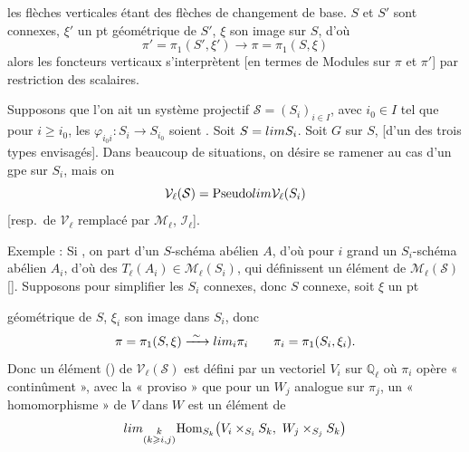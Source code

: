 \documentclass[11pt,a4paper]{article}
\begin{document}
les flèches verticales étant des flèches de changement de base.
 $S$ et $S'$ sont connexes, $\xi'$ un pt géométrique de
$S'$, $\xi$ son image sur $S$, d'où
\[
\pi' = \pi_{1}(S', \xi') \longrightarrow \pi = \pi_{1}(S, \xi)
\]
alors les foncteurs verticaux s'interprètent [en termes de
\struck{\ill{}} Modules sur $\pi$ et $\pi'$] par restriction des scalaires.

Supposons que l'on ait un système projectif $\mathcal{S} =
(S_{i})_{i \in I}$, avec $i_{0} \in I$ tel que pour $i \geqslant i_{0}$,
les $\varphi_{i_{0}i} : S_{i} \to S_{i_{0}}$ soient .
Soit $S = \varprojlim S_{i}$. Soit $G$ sur $S$, [d'un des trois types
envisagés]. Dans beaucoup de situations, on désire se ramener au cas d'un
gpe sur $S_{i}$, mais on  \ill{} \ill{} \ill{}
\[
\mathcal{V}_{\ell}(\mathcal{S}) = \text{Pseudo}\varinjlim \mathcal{V}_{\ell}(S_{i})
\]
[resp.\ de $\mathcal{V}_{\ell}$ remplacé par $\mathcal{M}_{\ell}$,
$\mathcal{I}_{\ell}$].

Exemple : Si , on part d'un \struck{\ill{}}
$S$-schéma abélien $A$, d'où pour $i$ grand un $S_{i}$-schéma abélien
$A_{i}$, d'où des $T_{\ell}(A_{i}) \in \mathcal{M}_{\ell}(S_{i})$, qui
définissent un élément de \struck{\ill{}} $\mathcal{M}_{\ell}(\mathcal{S})$
[\ill{}]. Supposons pour simplifier les $S_{i}$ connexes, donc $S$
connexe, soit $\xi$ un pt

géométrique de $S$, $\xi_{i}$ son image dans $S_{i}$, donc
\[
\pi = \pi_{1}(S, \xi) \xrightarrow{\ \sim\ } \varprojlim_{i} \pi_{i} \qquad \pi_{i} = \pi_{1}(S_{i}, \xi_{i}).
\]
Donc un élément () de $\mathcal{V}_{\ell}(\mathcal{S})$
 est défini par un
vectoriel $V_{i}$ sur $\mathbb{Q}_{\ell}$ où $\pi_{i}$ opère
« continûment », avec la « proviso » que pour un $W_{j}$ analogue sur
$\pi_{j}$, un « homomorphisme » de $V$ dans $W$ est un élément de
\[
\varinjlim_{\substack{k \\ (k \geqslant i, j)}} \mathrm{Hom}_{S_{k}}\bigl(V_{i} \times_{S_{i}} S_{k},\ W_{j} \times_{S_{j}} S_{k}\bigr)
\]
\end{document}

